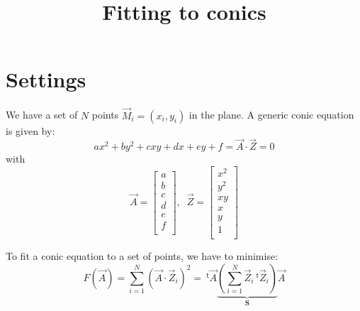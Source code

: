 \documentclass[aps]{revtex4}
\newcommand{\mymat}[1]{\boldsymbol{#1}}
\newcommand{\mytrn}[1]{~^{\mathsf{t}}\!{#1}}
\begin{document}
\title{Fitting to conics}
\maketitle
\section{Settings}

We have a set of $N$ points $\vec{M}_i = (x_i,y_i)$ in the plane.
A generic conic equation is given by:
\begin{equation}
	a x^2 + b y^2 + c xy + d x + e y + f = \vec{A}\cdot\vec{Z} = 0
\end{equation}
with
\begin{equation}
	\vec{A} = \begin{bmatrix}
		a\\
		b\\
		c\\
		d\\
		e\\
		f\\
	\end{bmatrix}, \;\;
	\vec{Z} = \begin{bmatrix}
	x^2\\
	y^2\\
	xy\\
	x\\
	y\\
	1\\
	\end{bmatrix}
\end{equation}

To fit a conic equation to a set of points, we have to minimise:
\begin{equation}
	F(\vec{A}) = \sum_{i=1}^N \left( \vec{A}\cdot\vec{Z}_i\right)^2 =
	 \mytrn{\vec{A}} \underbrace{\left(\sum_{i=1}^N \vec{Z}_i\mytrn{\vec{Z}}_i\right)}_{\mymat{S}} \vec{A}
\end{equation}
\end{document}
